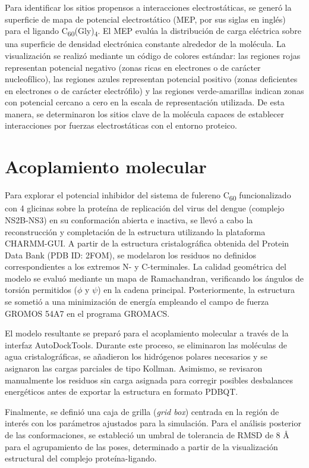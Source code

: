 Para identificar los sitios propensos a interacciones electrostáticas, se generó la superficie de mapa de potencial electrostático (MEP, por sus siglas en inglés) para el ligando C\textsubscript{60}(Gly)\textsubscript{4}. El MEP evalúa la distribución de carga eléctrica sobre una superficie de densidad electrónica constante alrededor de la molécula. La visualización se realizó mediante un código de colores estándar: las regiones rojas representan potencial negativo (zonas ricas en electrones o de carácter nucleofílico), las regiones azules representan potencial positivo (zonas deficientes en electrones o de carácter electrófilo) y las regiones verde-amarillas indican zonas con potencial cercano a cero en la escala de representación utilizada. De esta manera, se determinaron los sitios clave de la molécula capaces de establecer interacciones por fuerzas electrostáticas con el entorno proteico.

\section{Acoplamiento molecular}Para explorar el potencial inhibidor del sistema de fulereno C\textsubscript{60} funcionalizado con 4 glicinas sobre la proteína de replicación del virus del dengue (complejo NS2B-NS3) en su conformación abierta e inactiva, se llevó a cabo la reconstrucción y completación de la estructura utilizando la plataforma CHARMM-GUI. A partir de la estructura cristalográfica obtenida del Protein Data Bank (PDB ID: 2FOM), se modelaron los residuos no definidos correspondientes a los extremos N- y C-terminales. La calidad geométrica del modelo se evaluó mediante un mapa de Ramachandran, verificando los ángulos de torsión permitidos ($\phi$ y $\psi$) en la cadena principal. Posteriormente, la estructura se sometió a una minimización de energía empleando el campo de fuerza GROMOS 54A7 en el programa GROMACS.

El modelo resultante se preparó para el acoplamiento molecular a través de la interfaz AutoDockTools. Durante este proceso, se eliminaron las moléculas de agua cristalográficas, se añadieron los hidrógenos polares necesarios y se asignaron las cargas parciales de tipo Kollman. Asimismo, se revisaron manualmente los residuos sin carga asignada para corregir posibles desbalances energéticos antes de exportar la estructura en formato PDBQT.

Finalmente, se definió una caja de grilla (\textit{grid box}) centrada en la región de interés con los parámetros ajustados para la simulación. Para el análisis posterior de las conformaciones, se estableció un umbral de tolerancia de RMSD de 8 Å para el agrupamiento de las poses, determinado a partir de la visualización estructural del complejo proteína-ligando.
